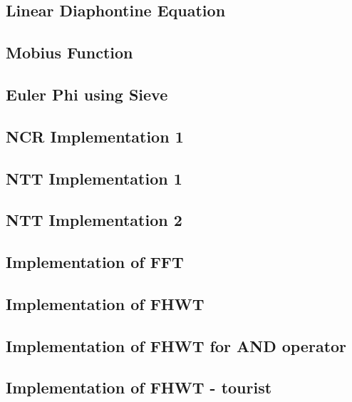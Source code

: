 \subsection{Linear Diaphontine Equation}
\raggedbottom
\hrulefill
\subsection{Mobius Function}
\raggedbottom
\hrulefill
\subsection{Euler Phi using Sieve}
\raggedbottom
\hrulefill
\subsection{NCR Implementation 1}
\raggedbottom
\hrulefill
\subsection{NTT Implementation 1}
\raggedbottom
\hrulefill
\subsection{NTT Implementation 2}
\raggedbottom
\hrulefill
\subsection{Implementation of FFT}
\raggedbottom
\hrulefill
\subsection{Implementation of FHWT}
\raggedbottom
\hrulefill
\subsection{Implementation of FHWT for AND operator}
\raggedbottom
\hrulefill
\subsection{Implementation of FHWT - tourist}
\raggedbottom
\hrulefill
